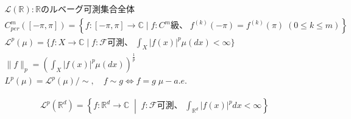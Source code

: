 \documentclass[12pt,b5paper]{ltjsarticle}
\begin{document}
\hrulefill

\begin{gather}
    \mathcal{L}(\mathbb{R})
     : \mathbb{R} の ルベーグ可測集合全体\\
    C_{per}^{m}([-\pi,\pi])
     =\left\{ f:[-\pi,\pi]\to \mathbb{C} \mid f:C^{m}級、\;
     f^{(k)}(-\pi)=f^{(k)}(\pi) \; (0\leq k \leq m) \right\}\\
    \mathcal{L}^{p}(\mu)=\{ f:X\to\mathbb{C}
     \mid f:\mathcal{F}可測、\; \int_{X} \lvert f(x)\rvert^{p} \mu(dx) < \infty \}\\
     \|f\|_{p} = \left( \int_{X} \lvert f(x)\rvert^{p} \mu(dx)\right)^{\frac{1}{p}}\\
     L^{p}(\mu)=\mathcal{L}^{p}(\mu)/\sim,\quad
      f\sim g \Leftrightarrow f=g \; \mu - a.e.
\end{gather}

\begin{gather}
    \mathcal{L}^{p}(\mathbb{R}^{d})=
    \left\{ f:\mathbb{R}^{d}\to\mathbb{C}
     \;\middle|\; f:\mathcal{F}可測、\; \int_{\mathbb{R}^{d}} \lvert f(x)\rvert^{p} dx < \infty \right\}
\end{gather}

\hrulefill
\end{document}
